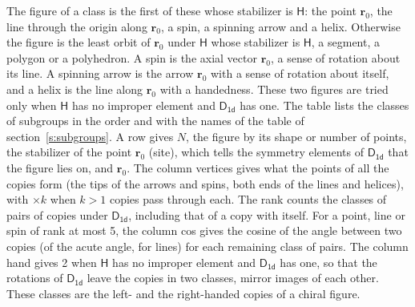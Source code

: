 \documentclass[10pt,a4paper]{article}
\numberwithin{equation}{section}
\newcommand{\grp}[1]{\mathsf{#1}}
\newcommand{\pointr}{\mathbf{r}}
\begin{document}
\leavevmode\label{n:head.figure}The figure of a class is the first of these whose stabilizer is $\grp{H}$: the point $\pointr_0$, the line through the origin along $\pointr_0$, a spin, a spinning arrow and a helix. Otherwise the figure is the least orbit of $\pointr_0$ under $\grp{H}$ whose stabilizer is $\grp{H}$, a segment, a polygon or a polyhedron. A spin is the axial vector $\pointr_0$, a sense of rotation about its line. A spinning arrow is the arrow $\pointr_0$ with a sense of rotation about itself, and a helix is the line along $\pointr_0$ with a handedness. These two figures are tried only when $\grp{H}$ has no improper element and $\grp{D_{1d}}$ has one. The table lists the classes of subgroups in the order and with the names of the table of section~\ref{s:subgroups}. \label{n:head.site}A row gives $N$, the figure by its shape or number of points, the stabilizer of the point $\pointr_0$ (site), which tells the symmetry elements of $\grp{D_{1d}}$ that the figure lies on, and $\pointr_0$. \label{n:head.vertices}The column vertices gives what the points of all the copies form (the tips of the arrows and spins, both ends of the lines and helices), with ${\times}k$ when $k > 1$ copies pass through each. \label{n:head.rank}The rank counts the classes of pairs of copies under $\grp{D_{1d}}$, including that of a copy with itself. \label{n:head.cos}For a point, line or spin of rank at most 5, the column cos gives the cosine of the angle between two copies (of the acute angle, for lines) for each remaining class of pairs. \label{n:head.hand}The column hand gives 2 when $\grp{H}$ has no improper element and $\grp{D_{1d}}$ has one, so that the rotations of $\grp{D_{1d}}$ leave the copies in two classes, mirror images of each other. These classes are the left- and the right-handed copies of a chiral figure.
\end{document}
